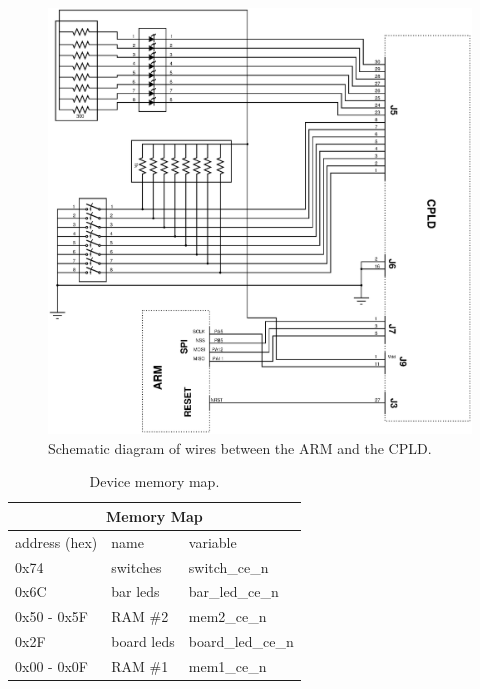 \documentclass{article}
\begin{document}
\begin{figure}
\center
\includegraphics[scale=0.7]{figure/schematics/SPI_LEDs_SW}
\caption{Schematic diagram of wires between the ARM and the CPLD.}
\label{fig:arm_to_cpld}
\end{figure}

\begin{table}
\center
\begin{tabular}{|l|l|l|}
    \hline
    \multicolumn{3}{|c|}{\textbf{Memory Map}} \\
    \hline
    address (hex) & name & variable \\
    \hline
    0x74 & switches & switch\_ce\_n \\
    0x6C & bar leds & bar\_led\_ce\_n \\
    0x50 - 0x5F & RAM \#2 & mem2\_ce\_n \\
    0x2F & board leds & board\_led\_ce\_n \\
    0x00 - 0x0F & RAM \#1 & mem1\_ce\_n \\
    \hline
\end{tabular}
\caption{Device memory map.}
\label{tbl:memmap}
\end{table}
\end{document}
